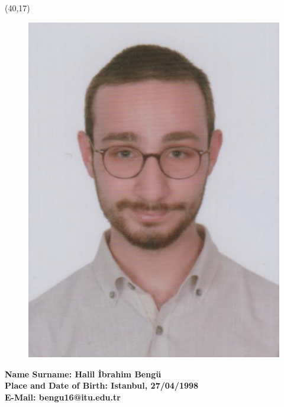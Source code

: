 \begin{textblock}{1}(40,17)
  \begin{figure}[p]
    \includegraphics[scale=0.25,keepaspectratio=true]{figures/vesikalik-enes.png}
  \end{figure}

\end{textblock}

\textbf{Name Surname: {\normalfont Halil İbrahim Bengü}} \\

\vspace{-3mm}
\textbf{Place and Date of Birth: {\normalfont Istanbul, 27/04/1998}} \\

\vspace{-3mm}
\textbf{E-Mail: {\normalfont bengu16@itu.edu.tr}} \\


